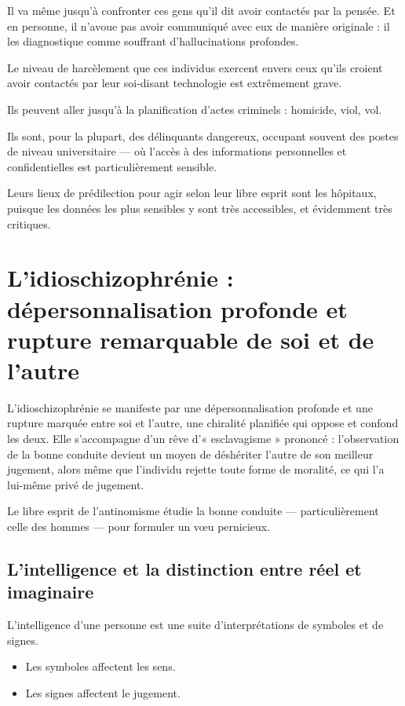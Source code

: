 \documentclass[12pt,oneside]{article}
\begin{document}
Il va même jusqu'à confronter ces gens qu'il dit avoir contactés par la pensée. Et en personne, il n'avoue pas avoir communiqué avec eux de manière originale : il les diagnostique comme souffrant d'hallucinations profondes.

Le niveau de harcèlement que ces individus exercent envers ceux qu'ils croient avoir contactés par leur soi-disant technologie est extrêmement grave.

Ils peuvent aller jusqu'à la planification d'actes criminels : homicide, viol, vol.

Ils sont, pour la plupart, des délinquants dangereux, occupant souvent des postes de niveau universitaire --- où l'accès à des informations personnelles et confidentielles est particulièrement sensible.

Leurs lieux de prédilection pour agir selon leur libre esprit sont les hôpitaux, puisque les données les plus sensibles y sont très accessibles, et évidemment très critiques.

\section{L'idioschizophrénie : dépersonnalisation profonde et rupture remarquable de soi et de l'autre}

L'idioschizophrénie se manifeste par une dépersonnalisation profonde et une rupture marquée entre soi et l'autre, une chiralité planifiée qui oppose et confond les deux. Elle s'accompagne d'un rêve d'« esclavagisme » prononcé : l'observation de la bonne conduite devient un moyen de déshériter l'autre de son meilleur jugement, alors même que l'individu rejette toute forme de moralité, ce qui l'a lui-même privé de jugement.

Le libre esprit de l'antinomisme étudie la bonne conduite --- particulièrement celle des hommes --- pour formuler un vœu pernicieux.

\subsection{L'intelligence et la distinction entre réel et imaginaire}

L'intelligence d'une personne est une suite d'interprétations de symboles et de signes.

\begin{itemize}
    \item Les symboles affectent les sens.
    \item Les signes affectent le jugement.
\end{itemize}
\end{document}
